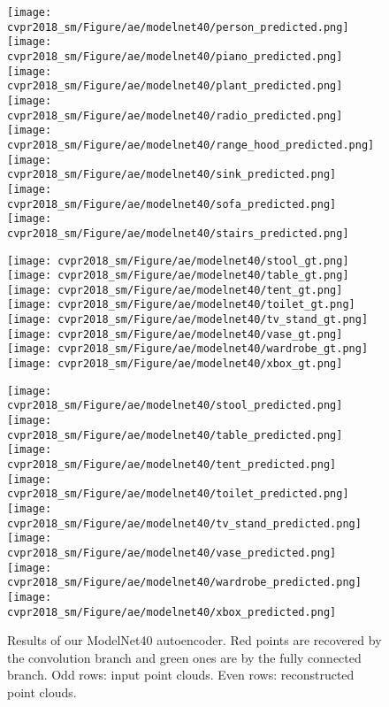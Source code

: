 \documentclass[10pt,twocolumn,letterpaper]{article}
\begin{document}
\begin{figure*}[t]
        \texttt{[image: cvpr2018\_sm/Figure/ae/modelnet40/person\_predicted.png]}
        \texttt{[image: cvpr2018\_sm/Figure/ae/modelnet40/piano\_predicted.png]}
        \texttt{[image: cvpr2018\_sm/Figure/ae/modelnet40/plant\_predicted.png]}
        \texttt{[image: cvpr2018\_sm/Figure/ae/modelnet40/radio\_predicted.png]}
        \texttt{[image: cvpr2018\_sm/Figure/ae/modelnet40/range\_hood\_predicted.png]}
        \texttt{[image: cvpr2018\_sm/Figure/ae/modelnet40/sink\_predicted.png]}
        \texttt{[image: cvpr2018\_sm/Figure/ae/modelnet40/sofa\_predicted.png]}
        \texttt{[image: cvpr2018\_sm/Figure/ae/modelnet40/stairs\_predicted.png]}
        
        \texttt{[image: cvpr2018\_sm/Figure/ae/modelnet40/stool\_gt.png]}
        \texttt{[image: cvpr2018\_sm/Figure/ae/modelnet40/table\_gt.png]}
        \texttt{[image: cvpr2018\_sm/Figure/ae/modelnet40/tent\_gt.png]}
        \texttt{[image: cvpr2018\_sm/Figure/ae/modelnet40/toilet\_gt.png]}
        \texttt{[image: cvpr2018\_sm/Figure/ae/modelnet40/tv\_stand\_gt.png]}
        \texttt{[image: cvpr2018\_sm/Figure/ae/modelnet40/vase\_gt.png]}
        \texttt{[image: cvpr2018\_sm/Figure/ae/modelnet40/wardrobe\_gt.png]}
        \texttt{[image: cvpr2018\_sm/Figure/ae/modelnet40/xbox\_gt.png]}
        
        \texttt{[image: cvpr2018\_sm/Figure/ae/modelnet40/stool\_predicted.png]}
        \texttt{[image: cvpr2018\_sm/Figure/ae/modelnet40/table\_predicted.png]}
        \texttt{[image: cvpr2018\_sm/Figure/ae/modelnet40/tent\_predicted.png]}
        \texttt{[image: cvpr2018\_sm/Figure/ae/modelnet40/toilet\_predicted.png]}
        \texttt{[image: cvpr2018\_sm/Figure/ae/modelnet40/tv\_stand\_predicted.png]}
        \texttt{[image: cvpr2018\_sm/Figure/ae/modelnet40/vase\_predicted.png]}
        \texttt{[image: cvpr2018\_sm/Figure/ae/modelnet40/wardrobe\_predicted.png]}
        \texttt{[image: cvpr2018\_sm/Figure/ae/modelnet40/xbox\_predicted.png]}
        \caption{Results of our ModelNet40 autoencoder. Red points are recovered by the convolution branch and green ones are by the fully connected branch. Odd rows: input point clouds. Even rows: reconstructed point clouds.}
        \label{fig_ae_modelnet}
        \vspace{-4pt}
\end{figure*}
\end{document}

